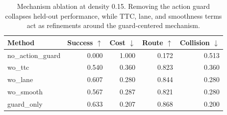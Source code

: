 \begin{table}[t]
\centering
\small
\begin{tabular}{lrrrr}
\toprule
Method & Success $\uparrow$ & Cost $\downarrow$ & Route $\uparrow$ & Collision $\downarrow$ \\
\midrule
no\_action\_guard & 0.000 & 1.000 & 0.172 & 0.513 \\
wo\_ttc & 0.540 & 0.360 & 0.823 & 0.360 \\
wo\_lane & 0.607 & 0.280 & 0.844 & 0.280 \\
wo\_smooth & 0.567 & 0.287 & 0.821 & 0.280 \\
guard\_only & 0.633 & 0.207 & 0.868 & 0.200 \\
\bottomrule
\end{tabular}
\caption{Mechanism ablation at density 0.15. Removing the action guard collapses held-out performance, while TTC, lane, and smoothness terms act as refinements around the guard-centered mechanism.}
\label{tab:ablation-d015}
\end{table}
